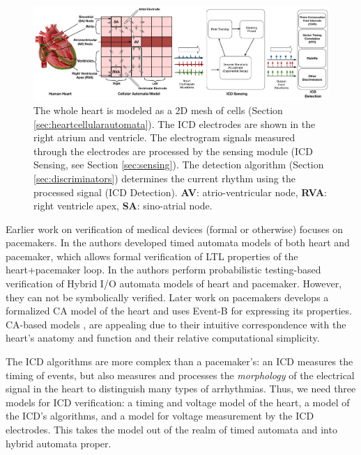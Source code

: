 \begin{figure}[t]
	\centering
	\vspace{-10pt}
	\includegraphics[scale=0.28]{figures/overviewFigure}
	\vspace{-10pt}
	\caption{\small The whole heart is modeled as a 2D mesh of cells (Section \ref{sec:heartcellularautomata}). The \ac{ICD} electrodes are shown in the right atrium and ventricle. The electrogram signals measured through the electrodes are processed by the sensing module (ICD Sensing, see Section \ref{sec:sensing}). The detection algorithm (Section \ref{sec:discriminators}) determines the current rhythm using the processed signal (ICD Detection). \textbf{AV}: atrio-ventricular node, \textbf{RVA}: right ventricle apex, \textbf{SA}: sino-atrial node.}
	\label{fig:overview}
	\vspace{-10pt}
\end{figure}
Earlier work on verification of medical devices (formal or otherwise) focuses on pacemakers.
In \cite{TACAS12} the authors developed timed automata models of both heart and pacemaker, which allows formal verification of LTL properties of the heart+pacemaker loop.
In \cite{Chen14_Quantitative} the authors perform probabilistic testing-based verification of Hybrid I/O automata models of heart and pacemaker.
However, they can not be symbolically verified.
Later work on pacemakers \cite{Mery} develops a formalized \ac{CA} model of the heart and uses Event-B for expressing its properties.
\ac{CA}-based models \cite{BartocciCBESG09_HIOAmodeling},\cite{Mery} are appealing due to their intuitive correspondence with the heart's anatomy and function and their relative computational simplicity.

The \ac{ICD} algorithms are more complex than a pacemaker's: an \ac{ICD} measures the timing of events, but also measures and processes the \emph{morphology} of the electrical signal in the heart to distinguish many types of arrhythmias.
Thus, we need three models for \ac{ICD} verification: a timing and voltage model of the heart, a model of the \ac{ICD}'s algorithms, and a model for voltage measurement by the \ac{ICD} electrodes.
This takes the model out of the realm of timed automata and into hybrid automata proper.

